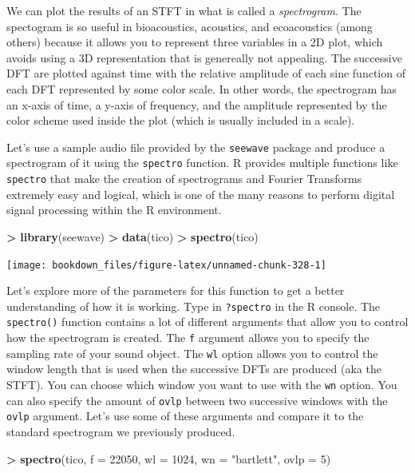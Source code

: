 \documentclass[]{krantz}
\makeatletter
\newenvironment{Shaded}{\begin{snugshade}}{\end{snugshade}}
\newcommand{\KeywordTok}[1]{\textcolor[rgb]{0.27,0.27,0.27}{\textbf{#1}}}
\newcommand{\DataTypeTok}[1]{\textcolor[rgb]{0.27,0.27,0.27}{#1}}
\newcommand{\DecValTok}[1]{\textcolor[rgb]{0.06,0.06,0.06}{#1}}
\newcommand{\StringTok}[1]{\textcolor[rgb]{0.5,0.5,0.5}{#1}}
\newcommand{\OperatorTok}[1]{\textcolor[rgb]{0.43,0.43,0.43}{\textbf{#1}}}
\newcommand{\NormalTok}[1]{#1}
\newenvironment{kframe}{%
\medskip{}
\setlength{\fboxsep}{.8em}
 \def\at@end@of@kframe{}%
 \ifinner\ifhmode%
  \def\at@end@of@kframe{\end{minipage}}%
  \begin{minipage}{\columnwidth}%
 \fi\fi%
 \def\FrameCommand##1{\hskip\@totalleftmargin \hskip-\fboxsep
 \colorbox{shadecolor}{##1}\hskip-\fboxsep
     \hskip-\linewidth \hskip-\@totalleftmargin \hskip\columnwidth}%
 \MakeFramed {\advance\hsize-\width
   \@totalleftmargin\z@ \linewidth\hsize
   \@setminipage}}%
 {\par\unskip\endMakeFramed%
 \at@end@of@kframe}
\renewenvironment{Shaded}{\begin{kframe}}{\end{kframe}}
\makeatother
\begin{document}
We can plot the results of an STFT in what is called a
\emph{spectrogram}. The spectogram is so useful in bioacoustics,
acoustics, and ecoacoustics (among others) because it allows you to
represent three variables in a 2D plot, which avoids using a 3D
representation that is genereally not appealing. The successive DFT are
plotted against time with the relative amplitude of each sine function
of each DFT represented by some color scale. In other words, the
spectrogram has an x-axis of time, a y-axis of frequency, and the
amplitude represented by the color scheme used inside the plot (which is
usually included in a scale).

Let's use a sample audio file provided by the \texttt{seewave} package
and produce a spectrogram of it using the \texttt{spectro} function. R
provides multiple functions like \texttt{spectro} that make the creation
of spectrograms and Fourier Transforms extremely easy and logical, which
is one of the many reasons to perform digital signal processing within
the R environment.

\begin{Shaded}
\begin{Highlighting}[]
\OperatorTok{>}\StringTok{ }\KeywordTok{library}\NormalTok{(seewave)}
\OperatorTok{>}\StringTok{ }\KeywordTok{data}\NormalTok{(tico)}
\OperatorTok{>}\StringTok{ }\KeywordTok{spectro}\NormalTok{(tico)}
\end{Highlighting}
\end{Shaded}

\texttt{[image: bookdown\_files/figure-latex/unnamed-chunk-328-1]}

Let's explore more of the parameters for this function to get a better
understanding of how it is working. Type in \texttt{?spectro} in the R
console. The \texttt{spectro()} function contains a lot of different
arguments that allow you to control how the spectrogram is created. The
\texttt{f} argument allows you to specify the sampling rate of your
sound object. The \texttt{wl} option allows you to control the window
length that is used when the successive DFTs are produced (aka the
STFT). You can choose which window you want to use with the \texttt{wn}
option. You can also specify the amount of \texttt{ovlp} between two
successive windows with the \texttt{ovlp} argument. Let's use some of
these arguments and compare it to the standard spectrogram we previously
produced.

\begin{Shaded}
\begin{Highlighting}[]
\OperatorTok{>}\StringTok{ }\KeywordTok{spectro}\NormalTok{(tico, }\DataTypeTok{f =} \DecValTok{22050}\NormalTok{, }\DataTypeTok{wl =} \DecValTok{1024}\NormalTok{, }\DataTypeTok{wn =} \StringTok{"bartlett"}\NormalTok{, }\DataTypeTok{ovlp =} \DecValTok{5}\NormalTok{)}
\end{Highlighting}
\end{Shaded}
\end{document}
